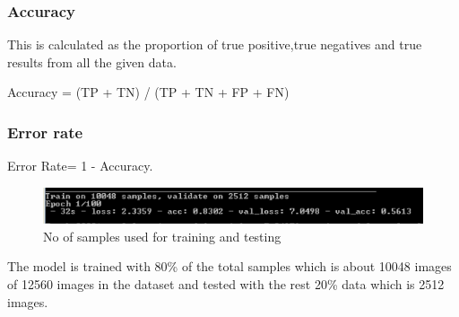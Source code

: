 \subsubsection{Accuracy}

\tab This is calculated as the proportion of true positive,true negatives and true results from all the given data. 

        \newline
        Accuracy  = (TP + TN) / (TP + TN + FP + FN)
\subsubsection{Error rate}
        Error Rate= 1  -  Accuracy. 
        
\newpage
\begin{figure}[htp]
\centering
\includegraphics[width=14cm]{Figures/sample.PNG}
\caption{No of samples used for training and testing}
\label{fig:lion}
\end{figure}       
The model is trained with 80\% of the total samples which is about 10048 images of 12560 images in the dataset and tested with the rest 20\% data which is 2512 images.

